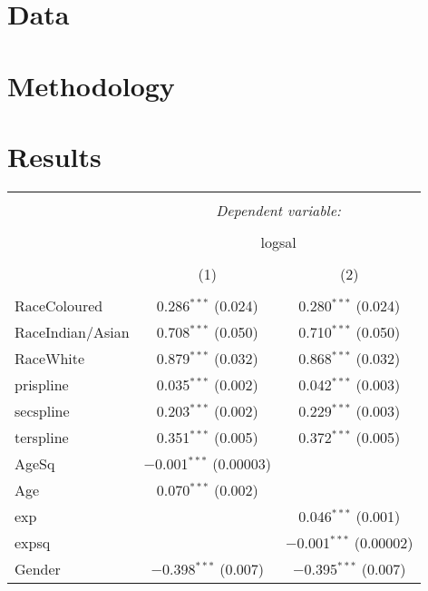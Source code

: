 \documentclass[11pt,preprint, authoryear]{elsarticle}
\let\origtable\table
\let\endorigtable\endtable
\renewenvironment{table}[1][2] {
    \expandafter\origtable\expandafter[H]
} {
    \endorigtable
}
\numberwithin{equation}{section}
\numberwithin{figure}{section}
\numberwithin{table}{section}
\begin{document}
\hypertarget{data}{%
\section{Data}\label{data}}

\hypertarget{methodology}{%
\section{Methodology}\label{methodology}}

\newpage

\hypertarget{results}{%
\section{Results}\label{results}}

\begin{table}[!htbp] \centering 
  \caption{Mincer Regressions} 
  \label{} 
\small 
\begin{tabular}{@{\extracolsep{3pt}}lcc} 
\\[-1.8ex]\hline 
\hline \\[-1.8ex] 
 & \multicolumn{2}{c}{\textit{Dependent variable:}} \\ 
\cline{2-3} 
\\[-1.8ex] & \multicolumn{2}{c}{logsal} \\ 
\\[-1.8ex] & (1) & (2)\\ 
\hline \\[-1.8ex] 
 RaceColoured & 0.286$^{***}$ (0.024) & 0.280$^{***}$ (0.024) \\ 
  RaceIndian/Asian & 0.708$^{***}$ (0.050) & 0.710$^{***}$ (0.050) \\ 
  RaceWhite & 0.879$^{***}$ (0.032) & 0.868$^{***}$ (0.032) \\ 
  prispline & 0.035$^{***}$ (0.002) & 0.042$^{***}$ (0.003) \\ 
  secspline & 0.203$^{***}$ (0.002) & 0.229$^{***}$ (0.003) \\ 
  terspline & 0.351$^{***}$ (0.005) & 0.372$^{***}$ (0.005) \\ 
  AgeSq & $-$0.001$^{***}$ (0.00003) &  \\ 
  Age & 0.070$^{***}$ (0.002) &  \\ 
  exp &  & 0.046$^{***}$ (0.001) \\ 
  expsq &  & $-$0.001$^{***}$ (0.00002) \\ 
  Gender & $-$0.398$^{***}$ (0.007) & $-$0.395$^{***}$ (0.007) \\ 

\end{tabular}
\end{table}
\end{document}
